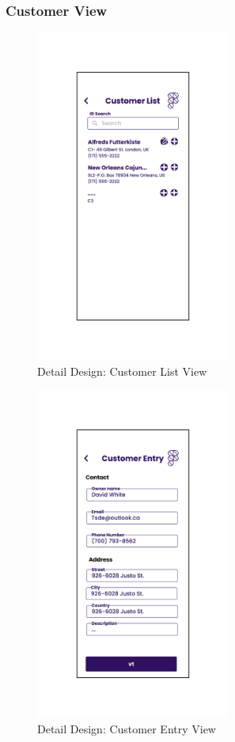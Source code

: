 \documentclass[../thesis.tex]{subfiles}
\begin{document}
\subsubsection{Customer View}

\begin{figure}[H]
    \centering
    \includegraphics[width=0.57\textwidth]{images/DetailedDesign_Customer_List.png}
    \caption{Detail Design: Customer List View}
    \label{fig:DetailedDesign_Customer_List}
\end{figure}

\begin{figure}[H]
    \centering
    \includegraphics[width=0.57\textwidth]{images/DetailedDesign_Customer_Entry.png}
    \caption{Detail Design: Customer Entry View}
    \label{fig:DetailedDesign_Customer_Entry}
\end{figure}
\end{document}
